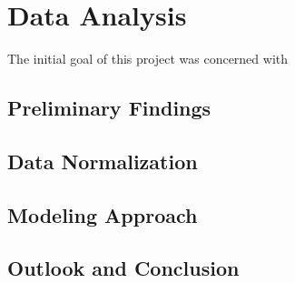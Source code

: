 \chapter{Data Analysis}
\label{ch:data-analysis}

The initial goal of this project was concerned with 

\section{Preliminary Findings}
\section{Data Normalization}
\section{Modeling Approach}
\section{Outlook and Conclusion}